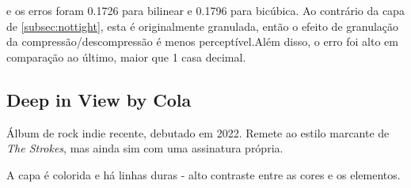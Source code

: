 \documentclass{article}
\begin{document}
e os erros foram 0.1726 para bilinear e 0.1796 para bicúbica.
Ao contrário da capa de \ref{subsec:nottight}, esta é originalmente
granulada, então o efeito de granulação da compressão/descompressão é
menos perceptível.Além disso, o erro foi alto em comparação ao último,
maior que 1 casa decimal.

\subsection{Deep in View by Cola}

Álbum de rock indie recente, debutado em 2022. Remete ao estilo marcante
de \textit{The Strokes}, mas ainda sim com uma assinatura própria.

A capa é colorida e há linhas duras - alto contraste entre as cores e
os elementos.
\end{document}
